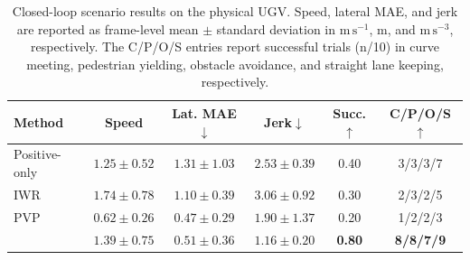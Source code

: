\begin{table}[!t]
\centering
\caption{{\normalfont Closed-loop scenario results on the physical UGV. Speed, lateral MAE, and jerk are reported as frame-level mean $\pm$ standard deviation in $\mathrm{m\,s^{-1}}$, $\mathrm{m}$, and $\mathrm{m\,s^{-3}}$, respectively. The C/P/O/S entries report successful trials (n/10) in curve meeting, pedestrian yielding, obstacle avoidance, and straight lane keeping, respectively.}}
\label{tab:ugv_closedloop}
\footnotesize
\setlength{\tabcolsep}{1pt}
\renewcommand{\arraystretch}{1.03}
\begin{tabular*}{0.96\columnwidth}
{@{\extracolsep{\fill}}lccccc@{}}
\toprule
Method & Speed & Lat. MAE$\downarrow$ & Jerk$\downarrow$ & Succ.$\uparrow$ & C/P/O/S$\uparrow$ \\
\midrule
Positive-only
& $1.25{\pm}0.52$
& $1.31{\pm}1.03$
& $2.53{\pm}0.39$
& 0.40
& 3/3/3/7\\

IWR~\cite{mandlekar2020iwr}
& $1.74{\pm}0.78$
& $1.10{\pm}0.39$
& $3.06{\pm}0.92$
& 0.30
& 2/3/2/5\\

PVP~\cite{peng2023pvp}
& $0.62{\pm}0.26$
& $\bm{0.47}{\pm}0.29$
& $1.90{\pm}1.37$
& 0.20
& 1/2/2/3\\

\DOVE{}
& $1.39{\pm}0.75$
& $0.51{\pm}0.36$
& $\bm{1.16}{\pm}0.20$
& \textbf{0.80}
& \textbf{8/8/7/9}\\

\bottomrule
\end{tabular*}
\end{table}
